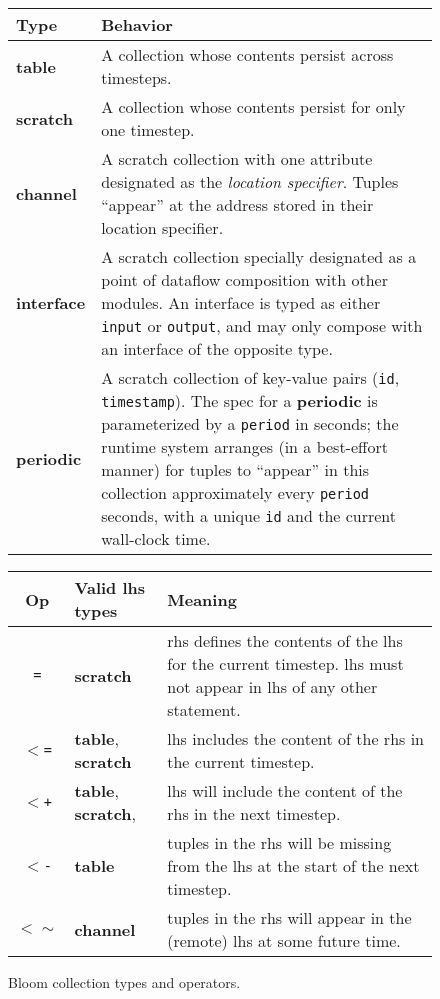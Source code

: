 \begin{figure}
	\begin{small}
	\begin{tabular}{|l|p{2.55in}|}
		\hline
		Type & Behavior\\
		\hline
		\textbf{table} & A collection whose contents persist across timesteps.\\
		\textbf{scratch} & A collection whose contents persist for only one timestep.\\
		\textbf{channel} & A scratch collection with one attribute designated as the {\em location specifier}. Tuples ``appear'' at the address stored in their location specifier.\\
    \textbf{interface} & A scratch collection specially designated as a point of dataflow composition with other modules.  An interface is typed as either \texttt{input} or \texttt{output}, and may only compose with an interface of the opposite type.\\
		\textbf{periodic} & A scratch collection of key-value pairs (\texttt{id}, \texttt{timestamp}).  The spec for a \textbf{periodic} is parameterized by a \texttt{period} in seconds; the runtime system arranges (in a best-effort manner) for tuples to ``appear'' in this collection approximately every \texttt{period} seconds, with a unique \texttt{id} and the current wall-clock time.\\
		\hline
	\end{tabular}

	\vspace{2em}
	
	\begin{tabular}{|c|l|p{2in}|}
		\hline
		Op & Valid lhs types & Meaning\\
				\hline 
		\texttt{=} & \textbf{scratch} & rhs defines the contents of the lhs for the current timestep.  lhs must not appear in lhs of any other statement.\\
		\texttt{$<$=} & \textbf{table}, \textbf{scratch} & lhs includes the content of the rhs in the current timestep.\\
		\texttt{$<$+} & \textbf{table}, \textbf{scratch}, & lhs will include the content of the rhs in the next timestep.\\
		\texttt{$<$-} & \textbf{table} & tuples in the rhs will be missing from the lhs at the start of  the next timestep.\\
		\texttt{$<\sim$} & \textbf{channel} & tuples in the rhs will appear in the (remote) lhs at some future time.\\
		\hline
	\end{tabular}
	\end{small}
	\caption{Bloom collection types and operators.}
	\label{tab:bloom}
\end{figure}

